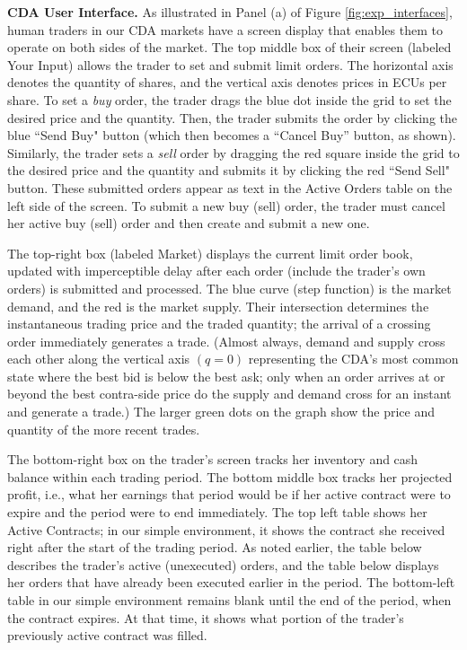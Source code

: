 \bigskip
\noindent
\textbf{CDA User Interface.}
As illustrated 
in Panel (a) of Figure \ref{fig:exp_interfaces}, human traders in our CDA markets have a screen display that enables them to operate on both sides of the market.
The top middle box of their screen
(labeled Your Input) allows the trader to set and submit limit orders. The horizontal axis denotes the quantity of shares, and the vertical axis denotes prices in ECUs per share. To set a \textit{buy} order, the trader drags the blue dot inside the grid to set the desired price and the quantity. Then, the trader submits the order by clicking the blue ``Send Buy" button (which then becomes a ``Cancel Buy'' button, as shown). 
Similarly, the trader sets a \textit{sell} order by dragging the red square inside the grid to the desired price and the quantity and submits it by clicking the red  ``Send Sell" button. 
These submitted orders appear as  text in the Active Orders table on the left side of the screen. 
To submit a new buy (sell) order, the trader must cancel her active buy (sell) order and then create and submit a new one. 

The top-right box (labeled Market) displays the current limit order book, updated with imperceptible delay after each order 
(include the trader's own orders) is submitted and processed. 
The blue curve (step function) 
is the market demand, and the red is the market supply. Their intersection determines the instantaneous trading price and the traded quantity;
the arrival of a crossing order immediately generates a trade.
(Almost always, demand and supply cross each other along the vertical axis $(q=0)$ representing the CDA's most common state where the best bid is below the best ask; only when an order arrives at or beyond the best contra-side price do the supply and demand cross for an instant and generate a trade.) 
The larger green dots on the graph show the price and quantity of the more recent trades.

The bottom-right box on the trader's screen tracks her inventory and cash balance within each trading period. 
The bottom middle box tracks her projected profit, i.e., what her earnings that period would be if her active contract were to expire and the period were to end immediately. 
The top left table shows her Active Contracts; in our simple environment, it shows the contract she received right after the start of the trading period. 
As noted earlier, the table below describes the trader's active (unexecuted) orders, and 
the table below displays her orders that have already been executed earlier in the period. 
The bottom-left table in our simple environment remains blank until the end of the period, when the contract expires. At that time, it shows what portion of the trader's previously active contract was filled. 

